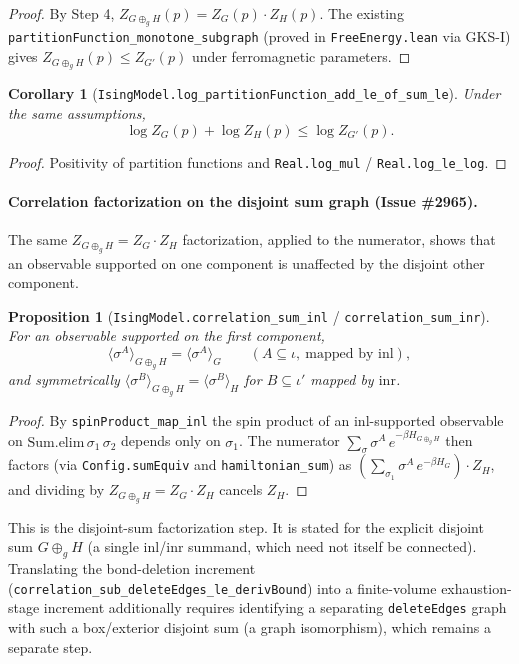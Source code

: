 \documentclass[a4paper,11pt]{article}
\newtheorem{proposition}[theorem]{Proposition}
\newtheorem{corollary}[theorem]{Corollary}
\begin{document}
\begin{proof}
By Step 4, $Z_{G \oplus_g H}(p) = Z_G(p) \cdot Z_H(p)$. The
existing \texttt{partitionFunction\_monotone\_subgraph} (proved in
\texttt{FreeEnergy.lean} via GKS-I) gives
$Z_{G \oplus_g H}(p) \le Z_{G'}(p)$ under ferromagnetic parameters.
\end{proof}

\begin{corollary}[\texttt{IsingModel.log\_partitionFunction\_add\_le\_of\_sum\_le}]
Under the same assumptions,
\[
  \log Z_G(p) + \log Z_H(p) \le \log Z_{G'}(p).
\]
\end{corollary}

\begin{proof}
Positivity of partition functions and \texttt{Real.log\_mul} /
\texttt{Real.log\_le\_log}.
\end{proof}

\paragraph{Correlation factorization on the disjoint sum graph (Issue \#2965).}
The same $Z_{G\oplus_g H}=Z_G\cdot Z_H$ factorization, applied to the numerator,
shows that an observable supported on one component is unaffected by the disjoint
other component.

\begin{proposition}[\texttt{IsingModel.correlation\_sum\_inl} /
\texttt{correlation\_sum\_inr}]
For an observable supported on the first component,
\[
  \langle\sigma^{A}\rangle_{G\oplus_g H}
    = \langle\sigma^{A}\rangle_{G}
  \qquad(A\subseteq\iota,\ \text{mapped by }\mathrm{inl}),
\]
and symmetrically $\langle\sigma^{B}\rangle_{G\oplus_g H}=\langle\sigma^{B}\rangle_{H}$
for $B\subseteq\iota'$ mapped by $\mathrm{inr}$.
\end{proposition}

\begin{proof}
By \texttt{spinProduct\_map\_inl} the spin product of an $\mathrm{inl}$-supported
observable on $\mathrm{Sum.elim}\,\sigma_1\,\sigma_2$ depends only on $\sigma_1$.
The numerator $\sum_\sigma \sigma^{A}\,e^{-\beta H_{G\oplus_g H}}$ then factors
(via \texttt{Config.sumEquiv} and \texttt{hamiltonian\_sum}) as
$(\sum_{\sigma_1}\sigma^{A}\,e^{-\beta H_G})\cdot Z_H$, and dividing by
$Z_{G\oplus_g H}=Z_G\cdot Z_H$ cancels $Z_H$.
\end{proof}

This is the disjoint-sum factorization step. It is stated for the explicit
disjoint sum $G\oplus_g H$ (a single $\mathrm{inl}$/$\mathrm{inr}$ summand, which
need not itself be connected). Translating the bond-deletion increment
(\texttt{correlation\_sub\_deleteEdges\_le\_derivBound}) into a finite-volume
exhaustion-stage increment additionally requires identifying a separating
\texttt{deleteEdges} graph with such a box/exterior disjoint sum (a graph
isomorphism), which remains a separate step.
\end{document}
